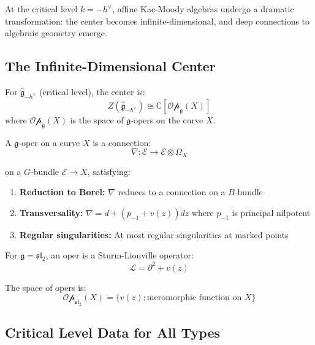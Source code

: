 At the critical level $k = -h^{\vee}$, affine Kac-Moody algebras undergo a dramatic 
transformation: the center becomes infinite-dimensional, and deep connections to 
algebraic geometry emerge.

\subsection{The Infinite-Dimensional Center}

\begin{theorem}
\label{thm:critical-level-center}
For $\widehat{\mathfrak{g}}_{-h^{\vee}}$ (critical level), the center is:
$$Z(\widehat{\mathfrak{g}}_{-h^{\vee}}) \cong \mathbb{C}[\mathcal{Op}_{\mathfrak{g}}(X)]$$
where $\mathcal{Op}_{\mathfrak{g}}(X)$ is the space of $\mathfrak{g}$-opers on the curve $X$.
\end{theorem}

\begin{definition}[Opers]
\label{def:opers}
A $\mathfrak{g}$-oper on a curve $X$ is a connection:
$$\nabla: \mathcal{E} \to \mathcal{E} \otimes \Omega_X$$

on a $G$-bundle $\mathcal{E} \to X$, satisfying:
\begin{enumerate}
\item \textbf{Reduction to Borel:} $\nabla$ reduces to a connection on a $B$-bundle
\item \textbf{Transversality:} $\nabla = d + (p_{-1} + v(z)) dz$ where $p_{-1}$ is principal nilpotent
\item \textbf{Regular singularities:} At most regular singularities at marked points
\end{enumerate}
\end{definition}

\begin{example}
For $\mathfrak{g} = \mathfrak{sl}_2$, an oper is a Sturm-Liouville operator:
$$\mathcal{L} = \partial^2 + v(z)$$

The space of opers is:
$$\mathcal{Op}_{\mathfrak{sl}_2}(X) = \{v(z) : \text{meromorphic function on } X\}$$
\end{example}

\subsection{Critical Level Data for All Types}

